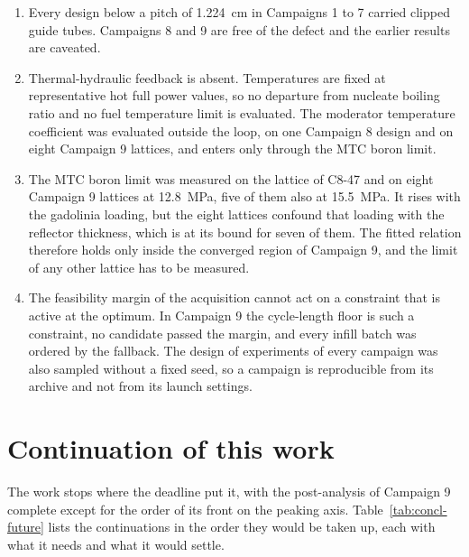 \begin{enumerate}
  \item Every design below a pitch of \SI{1.224}{cm} in Campaigns 1
        to 7 carried clipped guide tubes. Campaigns 8 and 9 are free of
        the defect and the earlier results are caveated.

  \item Thermal-hydraulic feedback is absent. Temperatures are fixed at
        representative hot full power values, so no departure from
        nucleate boiling ratio and no fuel temperature limit is
        evaluated. The moderator temperature coefficient was evaluated
        outside the loop, on one Campaign 8 design and on eight
        Campaign 9 lattices, and enters only through the MTC boron limit.

  \item The MTC boron limit was measured on the lattice of
        C8-47 and on eight Campaign 9 lattices at \SI{12.8}{MPa},
        five of them also at \SI{15.5}{MPa}. It rises with the
        gadolinia loading, but the eight lattices confound that loading
        with the reflector thickness, which is at its bound for seven of
        them. The fitted relation therefore holds only inside the
        converged region of Campaign 9, and the limit of any other
        lattice has to be measured.

  \item The feasibility margin of the acquisition cannot act on a
        constraint that is active at the optimum. In Campaign 9 the
        cycle-length floor is such a constraint, no candidate passed the
        margin, and every infill batch was ordered by the fallback. The
        design of experiments of every campaign was also sampled without
        a fixed seed, so a campaign is reproducible from its archive
        and not from its launch settings.
\end{enumerate}

\section{Continuation of this work}
\label{sec:concl-future}

The work stops where the deadline put it, with the post-analysis of
Campaign 9 complete except for the order of its front on the peaking
axis. Table~\ref{tab:concl-future} lists the
continuations in the order they would be taken up, each with what it
needs and what it would settle.

